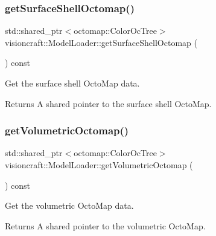 \subsubsection{\texorpdfstring{get\+Surface\+Shell\+Octomap()}{getSurfaceShellOctomap()}}
{\footnotesize\ttfamily std\+::shared\+\_\+ptr$<$octomap\+::\+Color\+Oc\+Tree$>$ visioncraft\+::\+Model\+Loader\+::get\+Surface\+Shell\+Octomap (\begin{DoxyParamCaption}{ }\end{DoxyParamCaption}) const\hspace{0.3cm}{\ttfamily [inline]}}



Get the surface shell Octo\+Map data. 

\begin{DoxyReturn}{Returns}
A shared pointer to the surface shell Octo\+Map. 
\end{DoxyReturn}
\mbox{\label{classvisioncraft_1_1ModelLoader_a8cf70f9736ed88dac4761fbd698a10c6}} 
\subsubsection{\texorpdfstring{get\+Volumetric\+Octomap()}{getVolumetricOctomap()}}
{\footnotesize\ttfamily std\+::shared\+\_\+ptr$<$octomap\+::\+Color\+Oc\+Tree$>$ visioncraft\+::\+Model\+Loader\+::get\+Volumetric\+Octomap (\begin{DoxyParamCaption}{ }\end{DoxyParamCaption}) const\hspace{0.3cm}{\ttfamily [inline]}}



Get the volumetric Octo\+Map data. 

\begin{DoxyReturn}{Returns}
A shared pointer to the volumetric Octo\+Map. 
\end{DoxyReturn}
\mbox{\label{classvisioncraft_1_1ModelLoader_a1f1dddeb3ef0d1ba500010b85098c2d0}} 
